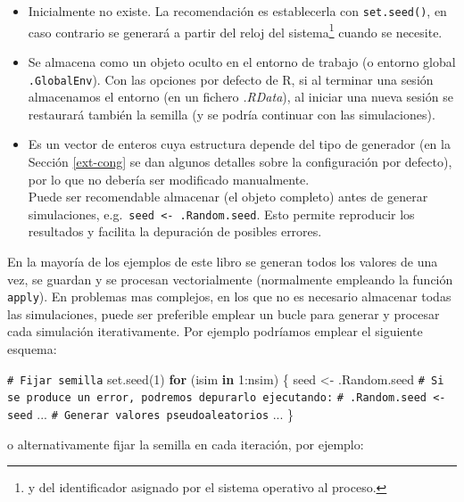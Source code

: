 \documentclass[
]{book}
\newenvironment{Shaded}{\begin{snugshade}}{\end{snugshade}}
\newcommand{\CommentTok}[1]{\textcolor[rgb]{0.56,0.35,0.01}{\textit{#1}}}
\newcommand{\ControlFlowTok}[1]{\textcolor[rgb]{0.13,0.29,0.53}{\textbf{#1}}}
\newcommand{\DecValTok}[1]{\textcolor[rgb]{0.00,0.00,0.81}{#1}}
\newcommand{\FunctionTok}[1]{\textcolor[rgb]{0.00,0.00,0.00}{#1}}
\newcommand{\NormalTok}[1]{#1}
\newcommand{\OtherTok}[1]{\textcolor[rgb]{0.56,0.35,0.01}{#1}}
\newcommand{\SpecialCharTok}[1]{\textcolor[rgb]{0.00,0.00,0.00}{#1}}
\theoremstyle{break}
\theoremstyle{nonumberplain}
\renewcommand{\CommentTok}[1]{\textcolor[rgb]{0.41,0.41,0.41}{\texttt{#1}}}
\begin{document}
\begin{itemize}
\item
  Inicialmente no existe.
  La recomendación es establecerla con \texttt{set.seed()}, en caso contrario se generará a partir del reloj del sistema\footnote{y del identificador asignado por el sistema operativo al proceso.} cuando se necesite.
\item
  Se almacena como un objeto oculto en el entorno de trabajo (o entorno global \texttt{.GlobalEnv}). Con las opciones por defecto de R, si al terminar una sesión almacenamos el entorno (en un fichero \emph{.RData}), al iniciar una nueva sesión se restaurará también la semilla (y se podría continuar con las simulaciones).
\item
  Es un vector de enteros cuya estructura depende del tipo de generador (en la Sección \ref{ext-cong} se dan algunos detalles sobre la configuración por defecto), por lo que no debería ser modificado manualmente.\\
  Puede ser recomendable almacenar (el objeto completo) antes de generar simulaciones, e.g.~\texttt{seed\ \textless{}-\ .Random.seed}. Esto permite reproducir los resultados y facilita la depuración de posibles errores.
\end{itemize}

En la mayoría de los ejemplos de este libro se generan todos los valores de una vez,
se guardan y se procesan vectorialmente (normalmente empleando la función \texttt{apply}).
En problemas mas complejos, en los que no es necesario almacenar todas las simulaciones,
puede ser preferible emplear un bucle para generar y procesar cada simulación iterativamente.
Por ejemplo podríamos emplear el siguiente esquema:

\begin{Shaded}
\begin{Highlighting}[]
\CommentTok{\# Fijar semilla}
\FunctionTok{set.seed}\NormalTok{(}\DecValTok{1}\NormalTok{)}
\ControlFlowTok{for}\NormalTok{ (isim }\ControlFlowTok{in} \DecValTok{1}\SpecialCharTok{:}\NormalTok{nsim) \{}
\NormalTok{  seed }\OtherTok{\textless{}{-}}\NormalTok{ .Random.seed}
  \CommentTok{\# Si se produce un error, podremos depurarlo ejecutando:}
  \CommentTok{\#  .Random.seed \textless{}{-} seed}
\NormalTok{  ...}
  \CommentTok{\# Generar valores pseudoaleatorios}
\NormalTok{  ...}
\NormalTok{\}}
\end{Highlighting}
\end{Shaded}

o alternativamente fijar la semilla en cada iteración, por ejemplo:
\end{document}
